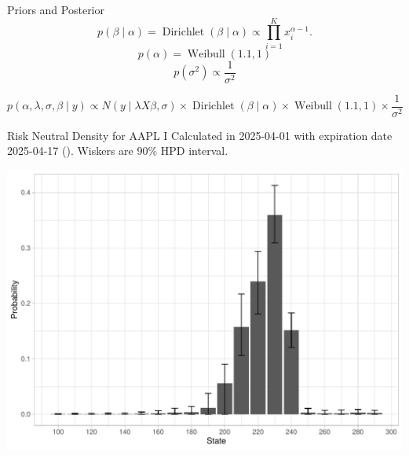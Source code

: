 \documentclass[10pt,aspectratio=43]{beamer}
\begin{document}
\begin{frame}{Priors and Posterior}
     \[p(\beta\mid \alpha)=\operatorname{Dirichlet}(\beta\mid \alpha)\propto \prod_{i=1}^{K}x_{i}^{\alpha-1}.\]
    \[p(\alpha)=\operatorname{Weibull}(1.1,1)\]
    \[p(\sigma^2)\propto \frac{1}{\sigma^2}\]

    \[p(\alpha,\lambda,\sigma,\beta\mid y)\propto N(y\mid \lambda X\beta,\sigma)\times\operatorname{Dirichlet}(\beta\mid \alpha)\times \operatorname{Weibull}(1.1,1)\times \frac{1}{\sigma^2}\]

\end{frame}





\begin{frame}{Risk Neutral Density for AAPL I}
    Calculated in 2025-04-01 with expiration date 2025-04-17 (). Wiskers are 90\% HPD interval.
    \begin{center}
        \includegraphics[width=0.8\linewidth]{betas_01_1.pdf}
    \end{center}
    
\end{frame}
\end{document}
